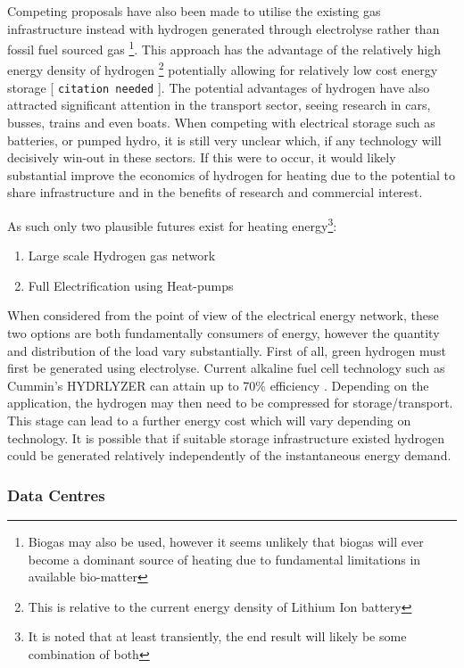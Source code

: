 \documentclass[11pt]{article}
\numberwithin{equation}{section}
\begin{document}
Competing proposals have also been made to utilise the existing gas infrastructure instead with hydrogen generated through electrolyse rather than fossil fuel sourced gas \footnote{Biogas may also be used, however it seems unlikely that biogas will ever become a dominant source of heating due to fundamental limitations in available bio-matter}. This approach has the advantage of the relatively high energy density of hydrogen \footnote{This is relative to the current energy density of Lithium Ion battery} potentially allowing for relatively low cost energy storage [ \texttt{citation needed} ]. The potential advantages of hydrogen have also attracted significant attention in the transport sector, seeing research in cars, busses, trains and even boats. When competing with electrical storage such as batteries, or pumped hydro, it is still very unclear which, if any technology will decisively win-out in these sectors. If this were to occur,  it would likely substantial improve the economics of hydrogen for heating due to the potential to share infrastructure and in the benefits of research and commercial interest.

As such only two plausible futures exist for heating energy\footnote{It is noted that at least transiently, the end result will likely be some combination of both}:

\begin{enumerate}
\item Large scale Hydrogen gas network
\item Full Electrification using Heat-pumps
\end{enumerate}

When considered from the point of view of the electrical energy network, these two options are both fundamentally consumers of energy, however the quantity and distribution of the load vary substantially. First of all, green hydrogen must first be generated using electrolyse. Current alkaline fuel cell technology such as Cummin's HYDRLYZER can attain up to 70\% efficiency \cite{CuminsElectrolizer}. Depending on the application, the hydrogen may then need to be compressed for storage/transport. This stage can lead to a further energy cost which will vary depending on technology. It is possible that if suitable storage infrastructure existed hydrogen could be generated relatively independently of the instantaneous energy demand.
\subsubsection{Data Centres \label{secDataCenters}}
\label{sec:orgf69ac02}
\end{document}
